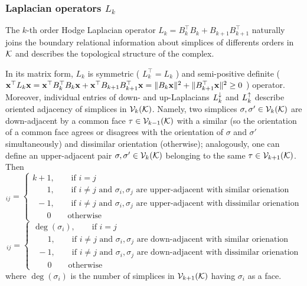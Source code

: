 \subsubsection{ Laplacian operators \( L_k \) }

The \(k\)-th order Hodge Laplacian operator \( L_k = B_k^\top B_k + B_{k+1} B_{k+1}^\top \) naturally joins the boundary relational information about simplices of differents orders in \( \mathcal{K} \) and describes the topological structure of the complex.

In its matrix form, \( L_k \) is symmetric ( \( L_k^\top = L_k\) ) and semi-positive definite ( \( \mathbf{x}^\top L_k \mathbf{x} = \mathbf{x}^\top  B_k^\top B_k \mathbf{x}  + \mathbf{x}^\top B_{k+1} B_{k+1}^\top \mathbf{x} = \| B_k \mathbf{x} \|^2 + \| B_{k+1}^\top \mathbf{x} \|^2 \ge 0 \) ) operator. Moreover, individual entries of down- and up-Laplacians \( L_{k}^{\downarrow} \) and \( L_{k}^{\uparrow} \) describe oriented adjacency of simplices in \( \mathcal{V}_{k}(\mathcal{K}) \). Namely, two simplices \( \sigma, \sigma' \in \mathcal{V}_{k}(\mathcal{K}) \) are down-adjacent by a common face \( \tau \in \mathcal{V}_{k-1}(\mathcal{K})\) with a similar  (so the orientation  of a common face agrees or disagrees with the orientation of \( \sigma \) and \( \sigma' \) simultaneously) and dissimilar orientation (otherwise); analogously, one can define an upper-adjacent pair \( \sigma, \sigma' \in \mathcal{V}_{k}(\mathcal{K})\) belonging to the same \( \tau \in \mathcal{V}_{k+1}(\mathcal{K}) \). Then
\begin{equation}
      [ \Ld k ]_{ij} = \begin{cases}
            k+1, \qquad \text{if } i = j \\
            \phantom{k+}1, \qquad \text{if } i \ne j  \text{ and } \sigma_i, \sigma_j \text{ are upper-adjacent with similar orienation} \\
            \phantom{k}-1, \qquad \text{if } i \ne j \text{ and } \sigma_i, \sigma_j \text{ are upper-adjacent with dissimilar orienation} \\
            \phantom{k+}0 \qquad \text{otherwise}
      \end{cases}
\end{equation}
\begin{equation}
      [ \Lu k ]_{ij} = \begin{cases}
            \deg(\sigma_i), \qquad \text{if } i = j \\
            \phantom{k+}1, \qquad \text{if } i \ne j  \text{ and } \sigma_i, \sigma_j \text{ are down-adjacent with similar orienation} \\
            \phantom{k}-1, \qquad \text{if } i \ne j \text{ and } \sigma_i, \sigma_j \text{ are down-adjacent with dissimilar orienation} \\
            \phantom{k+}0 \qquad \text{otherwise}
      \end{cases}
\end{equation}
where \( \deg(\sigma_i) \) is the number of simplices in \( \mathcal{V}_{k+1}(\mathcal{K})\) having \( \sigma_i\) as a face.

